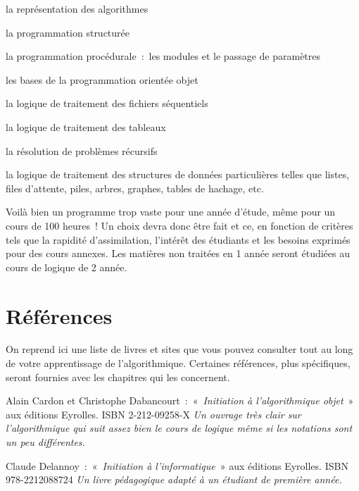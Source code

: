 	\begin{liste}
	\item 
		la représentation des algorithmes
	\item
		la programmation structurée
	\item
		la programmation procédurale~:~les modules et 
		le passage de paramètres
	\item
		les bases de la programmation orientée objet
	\item
		la logique de traitement des fichiers séquentiels
	\item
		la logique de traitement des tableaux
	\item
		la résolution de problèmes récursifs
	\item
		la logique de traitement des structures de données particulières telles
		que listes, files d’attente, piles, arbres, graphes, tables de hachage,
		etc.
	\end{liste}

	Voilà bien un programme trop vaste pour une année d’étude, même pour un
	cours de 100 heures~! Un choix devra donc être fait et ce, en fonction
	de critères tels que la rapidité d’assimilation, l’intérêt des
	étudiants et les besoins exprimés pour des cours annexes. Les
	matières non traitées en 1 année 
	seront étudiées au cours de logique de 2 année.

\section{Références}
	
	On reprend ici une liste de livres et sites que vous pouvez consulter
	tout au long de votre apprentissage de
	l’algorithmique. Certaines références, plus
	spécifiques, seront fournies avec les chapitres qui les concernent.

	\begin{liste}
	\item 
		Alain Cardon et Christophe Dabancourt~:~«~\textit{Initiation à
		l’algorithmique objet}~» aux éditions Eyrolles. ISBN
		2-212-09258-X
		\textit{Un ouvrage très clair sur l’algorithmique qui
		suit assez bien le cours de logique même si les notations sont un peu
		différentes.}
	\item
		Claude Delannoy~:~«~\textit{Initiation à
		l’informatique}~» aux éditions Eyrolles. 
		ISBN 978-2212088724
		\textit{Un livre pédagogique adapté à un étudiant de première année.}
	\end{liste}

